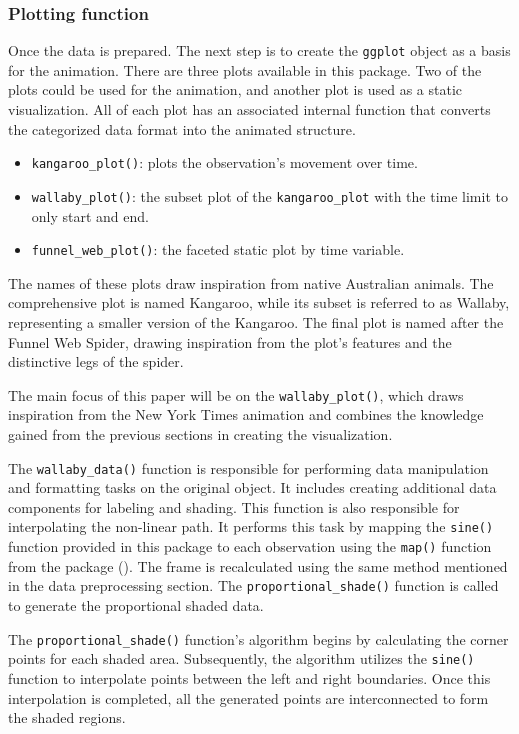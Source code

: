 \subsubsection{Plotting function}\label{plotting-function}

Once the data is prepared. The next step is to create the \texttt{ggplot} object as a basis for the animation. There are three plots available in this package. Two of the plots could be used for the animation, and another plot is used as a static visualization. All of each plot has an associated internal function that converts the categorized data format into the animated structure.

\begin{itemize}
\tightlist
\item
  \texttt{kangaroo\_plot()}: plots the observation's movement over time.
\item
  \texttt{wallaby\_plot()}: the subset plot of the \texttt{kangaroo\_plot} with the time limit to only start and end.
\item
  \texttt{funnel\_web\_plot()}: the faceted static plot by time variable.
\end{itemize}

The names of these plots draw inspiration from native Australian animals. The comprehensive plot is named Kangaroo, while its subset is referred to as Wallaby, representing a smaller version of the Kangaroo. The final plot is named after the Funnel Web Spider, drawing inspiration from the plot's features and the distinctive legs of the spider.

The main focus of this paper will be on the \texttt{wallaby\_plot()}, which draws inspiration from the New York Times animation and combines the knowledge gained from the previous sections in creating the visualization.

The \texttt{wallaby\_data()} function is responsible for performing data manipulation and formatting tasks on the original object. It includes creating additional data components for labeling and shading. This function is also responsible for interpolating the non-linear path. It performs this task by mapping the \texttt{sine()} function provided in this package to each observation using the \texttt{map()} function from the  package (\citet{purrr}). The frame is recalculated using the same method mentioned in the data preprocessing section. The \texttt{proportional\_shade()} function is called to generate the proportional shaded data.

The \texttt{proportional\_shade()} function's algorithm begins by calculating the corner points for each shaded area. Subsequently, the algorithm utilizes the \texttt{sine()} function to interpolate points between the left and right boundaries. Once this interpolation is completed, all the generated points are interconnected to form the shaded regions.

